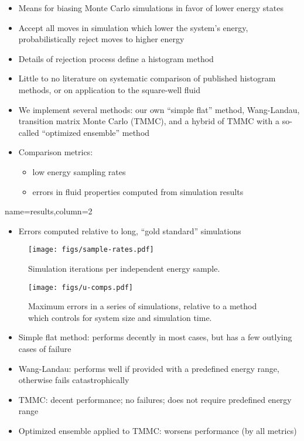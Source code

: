\documentclass[paperwidth=48in,paperheight=36in,
fontscale=0.27,margin=0.75in]{baposter}
\begin{document}
\begin{poster}
{    \begin{itemize}
    \item Means for biasing Monte Carlo simulations in favor of lower
      energy states
    \item Accept all moves in simulation which lower the system's
      energy, probabilistically reject moves to higher energy
    \item Details of rejection process define a histogram method
    \item Little to no literature on systematic comparison of
      published histogram methods, or on application to the
      square-well fluid
    \item We implement several methods: our own ``simple flat''
      method, Wang-Landau, transition matrix Monte Carlo (TMMC), and a
      hybrid of TMMC with a so-called ``optimized ensemble'' method
    \item Comparison metrics:
      \begin{itemize}
      \item low energy sampling rates
      \item errors in fluid properties computed from simulation
        results
      \end{itemize}
    \end{itemize}

  }

  {name=results,column=2}{%

    \begin{itemize}
    \item Errors computed relative to long, ``gold standard''
      simulations
    \end{itemize}

    \begin{figure}[H]
      \centering
      \texttt{[image: figs/sample-rates.pdf]}
      \caption{Simulation iterations per independent energy sample.}
      \label{fig:sample_rates}
    \end{figure}
    \begin{figure}[H]
      \centering
      \texttt{[image: figs/u-comps.pdf]}
      \caption{Maximum errors in a series of simulations, relative to
        a method which controls for system size and simulation time.}
      \label{fig:errors}
    \end{figure}

    \begin{itemize}
    \item Simple flat method: performs decently in most cases, but has
      a few outlying cases of failure
    \item Wang-Landau: performs well if provided with a predefined
      energy range, otherwise fails catastrophically
    \item TMMC: decent performance; no failures; does not require
      predefined energy range
    \item Optimized ensemble applied to TMMC: worsens performance (by
      all metrics)
    \end{itemize}

}
\end{poster}
\end{document}
